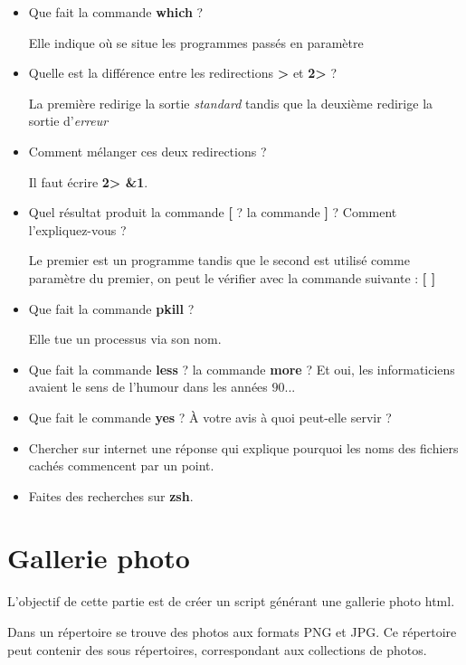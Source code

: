 \documentclass[11pt]{article}
\begin{document}
\begin{itemize}
\item Que fait la commande \textbf{which} ?
  \begin{solution}
    Elle indique où se situe les programmes passés en paramètre
  \end{solution}
\item Quelle est la différence entre les redirections \textbf{>} et \textbf{2>} ?
  \begin{solution}
    La première redirige la sortie \textit{standard} tandis que la deuxième redirige la sortie d'\textit{erreur}
  \end{solution}
\item Comment mélanger ces deux redirections ?
  \begin{solution}
    Il faut écrire \textbf{2> \&1}.
  \end{solution}
\item Quel résultat produit la commande \textbf{[} ? la commande \textbf{]} ? Comment l'expliquez-vous ?
  \begin{solution}
    Le premier est un programme tandis que le second est utilisé comme paramètre du premier, on peut le vérifier avec la commande suivante : \textbf{[ ]}
  \end{solution}
\item Que fait la commande \textbf{pkill} ?
  \begin{solution}
    Elle tue un processus via son nom.
  \end{solution}
\item Que fait la commande \textbf{less} ? la commande \textbf{more} ? Et oui, les informaticiens avaient le sens de l'humour dans les années \(90\)...
\item Que fait le commande \textbf{yes} ? À votre avis à quoi peut-elle servir ?
\item Chercher sur internet une réponse qui explique pourquoi les noms des fichiers cachés commencent par un point.
\item Faites des recherches sur \textbf{zsh}.
\end{itemize}


\section{Gallerie photo}

L'objectif de cette partie est de créer un script générant une gallerie photo html.

Dans un répertoire se trouve des photos aux formats PNG et JPG. Ce répertoire peut contenir des sous répertoires, correspondant aux collections de photos.
\end{document}
